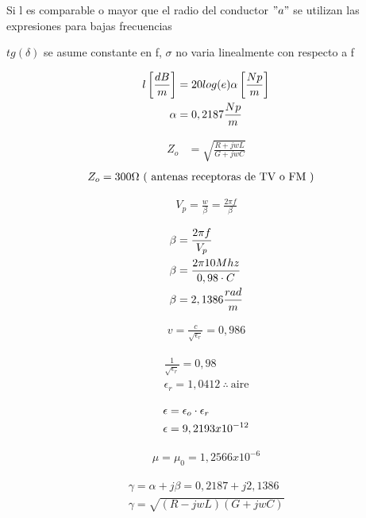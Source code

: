 Si l es comparable o mayor que el radio del conductor $"a"$ se utilizan las expresiones para bajas frecuencias 


    $tg (\delta)$ se asume constante en f, $\sigma$ no varia linealmente con respecto a f

\begin{align}
    l \left[ \frac{dB}{m} \right] &= 20 log (e) \alpha \left[ \frac{Np}{m} \right] \\
    \alpha &= 0,2187 \frac{Np}{m} \notag
\end{align}    

\begin{align}
    Z_o &= \sqrt{ \frac{ R + jwL }  { G + jwC } }
    \label{ec 1}
\end{align}
\begin{align}
    Z_o &= 300 \Omega \   \text{( antenas receptoras de TV o FM )}   \notag
\end{align}


\begin{align}
    V_p = \frac{w}{\beta} = \frac{2 \pi f}{ \beta }
\end{align}

\begin{align}
    \beta &= \frac{ 2 \pi f } { V_p } \\
    \beta &= \frac{ 2 \pi 10Mhz } { 0,98 \cdot C } \notag \\
    \beta &= 2,1386 \frac{rad}{m} \notag
\end{align}

\begin{align*}
    v = \frac{c}{\sqrt{\epsilon_r}} = 0,986
\end{align*}

\begin{align*}
    \frac{1}{\sqrt{\epsilon_r}} = 0,98\\
    \epsilon_r = 1,0412 \  \therefore \ \text{aire}
\end{align*}

\begin{align}
    \epsilon &= \epsilon_o \cdot \epsilon_r \\
    \epsilon &= 9,2193x10^{-12} \notag
\end{align}

\begin{align*}
    \mu = \mu_0 = 1,2566x10^{-6}
\end{align*}

\begin{align}
    \gamma = \alpha + j\beta = 0,2187 + j2,1386 \\
    \gamma = \sqrt{ (R - jwL) (G + jwC) }
    \label{ec 2}
\end{align}

